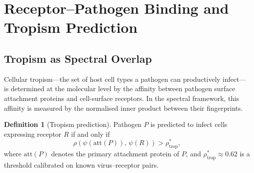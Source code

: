 \documentclass[twocolumn,11pt,a4paper]{article}
\theoremstyle{definition}
\newtheorem{definition}[theorem]{Definition}
\theoremstyle{remark}
\begin{document}
\section{Receptor--Pathogen Binding and Tropism Prediction}
\label{sec:tropism}

\subsection{Tropism as Spectral Overlap}

Cellular tropism---the set of host cell types a pathogen can productively
infect---is determined at the molecular level by the affinity between pathogen
surface attachment proteins and cell-surface receptors. In the spectral
framework, this affinity is measured by the normalised inner product between
their fingerprints.

\begin{definition}[Tropism prediction]
\label{def:tropism}
Pathogen $P$ is predicted to infect cells expressing receptor $R$ if and only if
\begin{equation}
  \rho\!\left(\psi(\text{att}(P)),\, \psi(R)\right) > \rho^*_{\text{trop}},
  \label{eq:tropism}
\end{equation}
where $\text{att}(P)$ denotes the primary attachment protein of $P$, and
$\rho^*_{\text{trop}} \approx 0.62$ is a threshold calibrated on known
virus--receptor pairs.
\end{definition}
\end{document}
